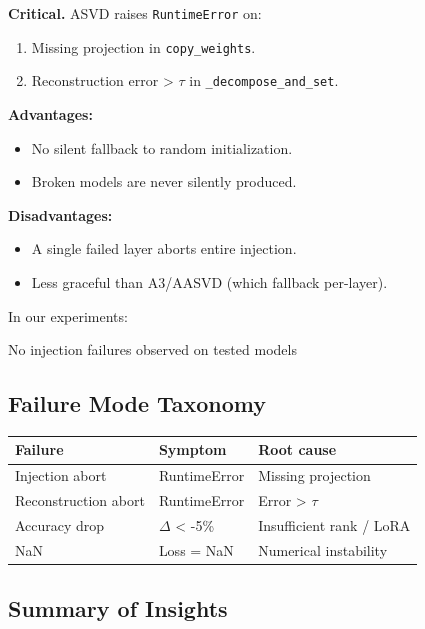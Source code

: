 \textbf{Critical.} ASVD raises \texttt{RuntimeError} on:

\begin{enumerate}
\item Missing projection in \texttt{copy\_weights}.
\item Reconstruction error \textgreater{} $\tau$ in \texttt{\_decompose\_and\_set}.

\end{enumerate}
\textbf{Advantages:}
\begin{itemize}
\item No silent fallback to random initialization.
\item Broken models are never silently produced.

\end{itemize}
\textbf{Disadvantages:}
\begin{itemize}
\item A single failed layer aborts entire injection.
\item Less graceful than A3/AASVD (which fallback per-layer).

\end{itemize}
In our experiments:

No injection failures observed on tested models

\subsection{Failure Mode Taxonomy}

\begin{table}[H]
\centering
\small
\begin{tabular}{lll}
\toprule
\textbf{Failure} & \textbf{Symptom} & \textbf{Root cause} \\
\midrule
Injection abort & RuntimeError & Missing projection \\
Reconstruction abort & RuntimeError & Error \textgreater{} $\tau$ \\
Accuracy drop & $\Delta$ \textless{} -5\% & Insufficient rank / LoRA \\
NaN & Loss = NaN & Numerical instability \\
\bottomrule
\end{tabular}
\end{table}

\subsection{Summary of Insights}


